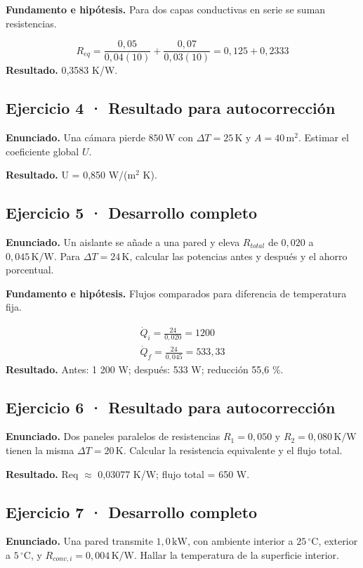 \documentclass[11pt,a4paper]{article}
\begin{document}
\textbf{Fundamento e hipótesis.} Para dos capas conductivas en serie se suman resistencias.

\[
R_{eq}=\frac{0{,}05}{0{,}04(10)}+\frac{0{,}07}{0{,}03(10)}=0{,}125+0{,}2333
\]
\textbf{Resultado.} 0,3583 K/W.


\subsection*{Ejercicio 4 · Resultado para autocorrección}
\textbf{Enunciado.} Una cámara pierde \(850\,\mathrm W\) con \(\Delta T=25\,\mathrm K\) y \(A=40\,\mathrm m^2\). Estimar el coeficiente global \(U\).

\textbf{Resultado.} U = 0,850 W/(m\ensuremath{^2} K).


\subsection*{Ejercicio 5 · Desarrollo completo}
\textbf{Enunciado.} Un aislante se añade a una pared y eleva \(R_{total}\) de \(0{,}020\) a \(0{,}045\,\mathrm{K/W}\). Para \(\Delta T=24\,\mathrm K\), calcular las potencias antes y después y el ahorro porcentual.

\textbf{Fundamento e hipótesis.} Flujos comparados para diferencia de temperatura fija.

\[
\begin{gathered}
\dot Q_i=\frac{24}{0{,}020}=1200\\\dot Q_f=\frac{24}{0{,}045}=533{,}33
\end{gathered}
\]
\textbf{Resultado.} Antes: 1 200 W; después: 533 W; reducción 55,6 \%.


\subsection*{Ejercicio 6 · Resultado para autocorrección}
\textbf{Enunciado.} Dos paneles paralelos de resistencias \(R_1=0{,}050\) y \(R_2=0{,}080\,\mathrm{K/W}\) tienen la misma \(\Delta T=20\,\mathrm K\). Calcular la resistencia equivalente y el flujo total.

\textbf{Resultado.} Req \ensuremath{\approx} 0,03077 K/W; flujo total = 650 W.


\subsection*{Ejercicio 7 · Desarrollo completo}
\textbf{Enunciado.} Una pared transmite \(1{,}0\,\mathrm{kW}\), con ambiente interior a \(25\,^\circ\mathrm C\), exterior a \(5\,^\circ\mathrm C\), y \(R_{conv,i}=0{,}004\,\mathrm{K/W}\). Hallar la temperatura de la superficie interior.
\end{document}
